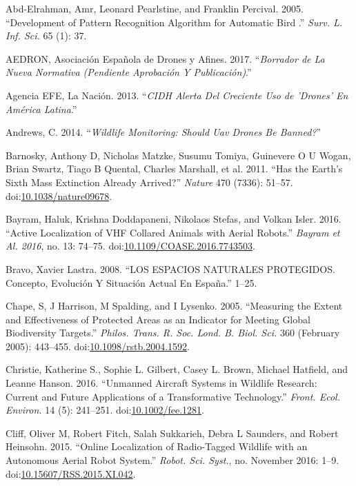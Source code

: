 \documentclass[]{interact}
\theoremstyle{plain}%
\theoremstyle{definition}
\theoremstyle{remark}
\begin{document}
\hypertarget{refs}{}
\hypertarget{ref-abd-elrahman_development_2005}{}
Abd-Elrahman, Amr, Leonard Pearlstine, and Franklin Percival. 2005.
``Development of Pattern Recognition Algorithm for Automatic Bird .''
\emph{Surv. L. Inf. Sci.} 65 (1): 37.

\hypertarget{ref-Aedron2017}{}
AEDRON, Asociación Española de Drones y Afines. 2017. ``\emph{Borrador
de La Nueva Normativa (Pendiente Aprobación Y Publicación)}.''

\hypertarget{ref-Nacion2013}{}
Agencia EFE, La Nación. 2013. ``\emph{CIDH Alerta Del Creciente Uso de
'Drones' En América Latina}.''

\hypertarget{ref-Andrews2014}{}
Andrews, C. 2014. ``\emph{Wildlife Monitoring: Should Uav Drones Be
Banned?}''

\hypertarget{ref-barnosky_has_2011}{}
Barnosky, Anthony D, Nicholas Matzke, Susumu Tomiya, Guinevere O U
Wogan, Brian Swartz, Tiago B Quental, Charles Marshall, et al. 2011.
``Has the Earth's Sixth Mass Extinction Already Arrived?'' \emph{Nature}
470 (7336): 51--57.
doi:\href{https://doi.org/10.1038/nature09678}{10.1038/nature09678}.

\hypertarget{ref-bayram_active_2016}{}
Bayram, Haluk, Krishna Doddapaneni, Nikolaos Stefas, and Volkan Isler.
2016. ``Active Localization of VHF Collared Animals with Aerial
Robots.'' \emph{Bayram et Al. 2016}, no. 13: 74--75.
doi:\href{https://doi.org/10.1109/COASE.2016.7743503}{10.1109/COASE.2016.7743503}.

\hypertarget{ref-bravo_espacios_2008}{}
Bravo, Xavier Lastra. 2008. ``LOS ESPACIOS NATURALES PROTEGIDOS.
Concepto, Evolución Y Situación Actual En España.'' 1--25.

\hypertarget{ref-chape_measuring_2005}{}
Chape, S, J Harrison, M Spalding, and I Lysenko. 2005. ``Measuring the
Extent and Effectiveness of Protected Areas as an Indicator for Meeting
Global Biodiversity Targets.'' \emph{Philos. Trans. R. Soc. Lond. B.
Biol. Sci.} 360 (February 2005): 443--455.
doi:\href{https://doi.org/10.1098/rstb.2004.1592}{10.1098/rstb.2004.1592}.

\hypertarget{ref-christie_unmanned_2016}{}
Christie, Katherine S., Sophie L. Gilbert, Casey L. Brown, Michael
Hatfield, and Leanne Hanson. 2016. ``Unmanned Aircraft Systems in
Wildlife Research: Current and Future Applications of a Transformative
Technology.'' \emph{Front. Ecol. Environ.} 14 (5): 241--251.
doi:\href{https://doi.org/10.1002/fee.1281}{10.1002/fee.1281}.

\hypertarget{ref-cliff_online_2015}{}
Cliff, Oliver M, Robert Fitch, Salah Sukkarieh, Debra L Saunders, and
Robert Heinsohn. 2015. ``Online Localization of Radio-Tagged Wildlife
with an Autonomous Aerial Robot System.'' \emph{Robot. Sci. Syst.}, no.
November 2016: 1--9.
doi:\href{https://doi.org/10.15607/RSS.2015.XI.042}{10.15607/RSS.2015.XI.042}.
\end{document}
